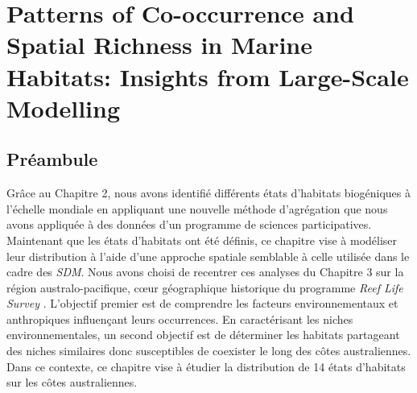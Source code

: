 \begin{refsection}

\hypertarget{patterns-of-co-occurrence-and-spatial-richness-in-marine-habitats-insights-from-large-scale-modelling}{%
\chapter{Patterns of Co-occurrence and Spatial Richness in Marine
Habitats: Insights from Large-Scale
Modelling}\label{patterns-of-co-occurrence-and-spatial-richness-in-marine-habitats-insights-from-large-scale-modelling}}

\hypertarget{preambule-chapter3}{%
\section*{Préambule}\label{preambule-chapter3}}

Grâce au Chapitre 2, nous avons identifié différents états d'habitats
biogéniques à l'échelle mondiale en appliquant une nouvelle méthode
d'agrégation que nous avons appliquée à des données d'un programme de
sciences participatives. Maintenant que les états d'habitats ont été
définis, ce chapitre vise à modéliser leur distribution à l'aide d'une
approche spatiale semblable à celle utilisée dans le cadre des
\emph{SDM}. Nous avons choisi de recentrer ces analyses du Chapitre 3
sur la région australo-pacifique, cœur géographique historique du
programme \emph{Reef Life Survey} \autocite{Edgar_2009}. L'objectif
premier est de comprendre les facteurs environnementaux et anthropiques
influençant leurs occurrences. En caractérisant les niches
environnementales, un second objectif est de déterminer les habitats
partageant des niches similaires donc susceptibles de coexister le long
des côtes australiennes. Dans ce contexte, ce chapitre vise à étudier la
distribution de 14 états d'habitats sur les côtes australiennes.


\end{refsection}
